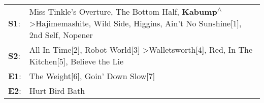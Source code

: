 \begin{supertabular}{p{0.03\textwidth}p{0.92\textwidth}}
 \textbf{S1}:  &  Miss Tinkle's Overture\textsuperscript{}, \enspace The Bottom Half\textsuperscript{}, \enspace \textbf{Kabump\textsuperscript{$\wedge$}} \textgreater \enspace Hajimemashite\textsuperscript{}, \enspace Wild Side\textsuperscript{}, \enspace Higgins\textsuperscript{}, \enspace Ain't No Sunshine[1]\textsuperscript{}, \enspace 2nd Self\textsuperscript{}, \enspace Nopener\textsuperscript{}  \enspace  \\
 \textbf{S2}:  &                                                                                                                                       All In Time[2]\textsuperscript{}, \enspace Robot World[3]\textsuperscript{} \textgreater \enspace Walletsworth[4]\textsuperscript{}, \enspace Red\textsuperscript{}, \enspace In The Kitchen[5]\textsuperscript{}, \enspace Believe the Lie\textsuperscript{}  \enspace  \\
 \textbf{E1}:  &                                                                                                                                                                                                                                                                                                                      The Weight[6]\textsuperscript{}, \enspace Goin' Down Slow[7]\textsuperscript{}  \enspace  \\
 \textbf{E2}:  &                                                                                                                                                                                                                                                                                                                                                                    Hurt Bird Bath\textsuperscript{}  \enspace  \\
\end{supertabular}

